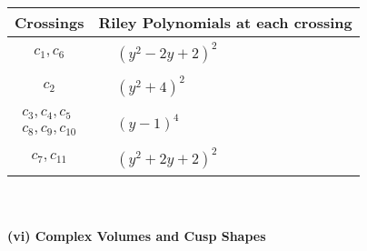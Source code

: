 \documentclass[1p]{elsarticle_modified}
\theoremstyle{definition}
\begin{document}
\begin{tabular}{m{50pt}|m{274pt}}
Crossings & \hspace{64pt}Riley Polynomials at each crossing \\
\hline $$\begin{aligned}c_{1},c_{6}\end{aligned}$$&$\begin{aligned}
&(y^2-2 y+2)^2
\end{aligned}$\\
\hline $$\begin{aligned}c_{2}\end{aligned}$$&$\begin{aligned}
&(y^2+4)^2
\end{aligned}$\\
\hline $$\begin{aligned}c_{3},c_{4},c_{5}\\c_{8},c_{9},c_{10}\end{aligned}$$&$\begin{aligned}
&(y-1)^4
\end{aligned}$\\
\hline $$\begin{aligned}c_{7},c_{11}\end{aligned}$$&$\begin{aligned}
&(y^2+2 y+2)^2
\end{aligned}$\\
\hline
\end{tabular}\\~\\
\newpage\flushleft \textbf{(vi) Complex Volumes and Cusp Shapes}
\end{document}
